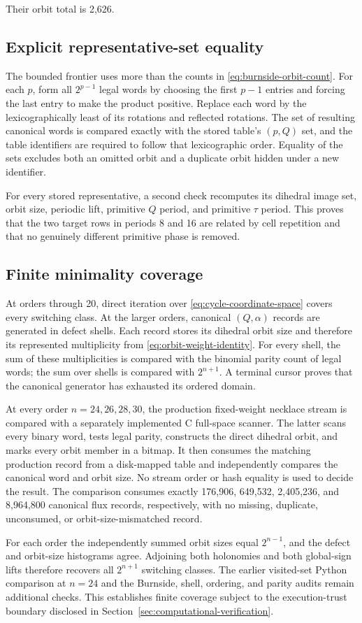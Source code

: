Their orbit total is 2,626.

\subsection{Explicit representative-set equality}

The bounded frontier uses more than the counts in \eqref{eq:burnside-orbit-count}. For each \(p\), form
all \(2^{p-1}\) legal words by choosing the first \(p-1\) entries and forcing the
last entry to make the product positive. Replace each word by the
lexicographically least of its rotations and reflected rotations. The set of
resulting canonical words is compared exactly with the stored table's
\((p,Q)\) set, and the table identifiers are required to follow that
lexicographic order. Equality of the sets excludes both an omitted orbit and a
duplicate orbit hidden under a new identifier.

For every stored representative, a second check recomputes its dihedral image
set, orbit size, periodic lift, primitive \(Q\) period, and primitive \(\tau\)
period. This proves that the two target rows in periods 8 and 16 are related by
cell repetition and that no genuinely different primitive phase is removed.

\subsection{Finite minimality coverage}

At orders through 20, direct iteration over \eqref{eq:cycle-coordinate-space} covers every switching
class. At the larger orders, canonical \((Q,\alpha)\) records are generated in
defect shells. Each record stores its dihedral orbit size and therefore its
represented multiplicity from \eqref{eq:orbit-weight-identity}. For every shell, the sum of these
multiplicities is compared with the binomial parity count of legal words; the
sum over shells is compared with \(2^{n+1}\). A terminal cursor proves that the
canonical generator has exhausted its ordered domain.

At every order \(n=24,26,28,30\), the production fixed-weight necklace stream is
compared with a separately implemented C full-space scanner. The latter scans
every binary word, tests legal parity, constructs the direct dihedral orbit,
and marks every orbit member in a bitmap. It then consumes the matching
production record from a disk-mapped table and independently compares the
canonical word and orbit size. No stream order or hash equality is used to
decide the result. The comparison consumes exactly 176,906, 649,532,
2,405,236, and 8,964,800 canonical flux records, respectively, with no missing,
duplicate, unconsumed, or orbit-size-mismatched record.

For each order the independently summed orbit sizes equal \(2^{n-1}\), and the
defect and orbit-size histograms agree. Adjoining both holonomies and both
global-sign lifts therefore recovers all \(2^{n+1}\) switching classes. The
earlier visited-set Python comparison at \(n=24\) and the Burnside, shell,
ordering, and parity audits remain additional checks. This establishes finite
coverage subject to the execution-trust boundary disclosed in
Section~\ref{sec:computational-verification}.
